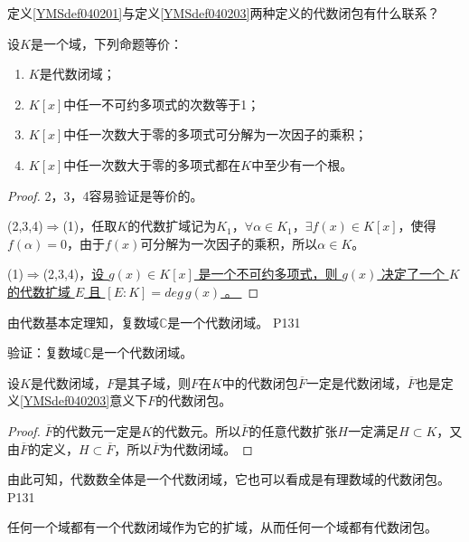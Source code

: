 \begin{proposition}
	定义\ref{YMSdef040201}与定义\ref{YMSdef040203}两种定义的代数闭包有什么联系？
\end{proposition}



\begin{theorem}
	设$K$是一个域，下列命题等价：
	\begin{enumerate}
		\item $K$是代数闭域；
		\item $K[x]$中任一不可约多项式的次数等于1；
		\item $K[x]$中任一次数大于零的多项式可分解为一次因子的乘积；
		\item $K[x]$中任一次数大于零的多项式都在$K$中至少有一个根。
	\end{enumerate}
\end{theorem}

\begin{proof}
	2，3，4容易验证是等价的。
	\par
	(2,3,4)$\Rightarrow$(1)，任取$K$的代数扩域记为$K_{1}$，$\forall \alpha\in K_{1}$，$\exists f(x)\in K[x]$，使得$f(\alpha)=0$，由于$f(x)$可分解为一次因子的乘积，所以$\alpha\in K$。
	\par
	(1)$\Rightarrow$(2,3,4)，\uline{设 $g(x)\in K[x]$ 是一个不可约多项式，则 $g(x)$ 决定了一个 $K$ 的代数扩域 $E$ 且 $[E:K]=deg\, g(x)$ 。  }
\end{proof}

\original
{
	由代数基本定理知，复数域$\mathbb{C}$是一个代数闭域。
}
{P131}

\begin{proposition}
	验证：复数域$\mathbb{C}$是一个代数闭域。
\end{proposition}


\begin{theorem}
	设$K$是代数闭域，$F$是其子域，则$F$在$K$中的代数闭包$\overline{F}$一定是代数闭域，$\overline{F}$也是定义\ref{YMSdef040203}意义下$F$的代数闭包。
\end{theorem}

\begin{proof}
	$\overline{F}$的代数元一定是$K$的代数元。所以$\overline{F}$的任意代数扩张$H$一定满足$H\subset K$，又由$\overline{F}$的定义，$H\subset \overline{F}$，所以$\overline{F}$为代数闭域。
\end{proof}

\original
{
	由此可知，代数数全体是一个代数闭域，它也可以看成是有理数域的代数闭包。
}
{P131}

\begin{theorem}
	任何一个域都有一个代数闭域作为它的扩域，从而任何一个域都有代数闭包。
\end{theorem}


